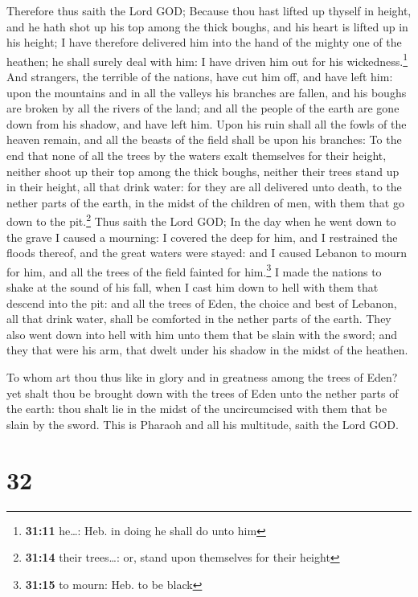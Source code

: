  Therefore thus saith the Lord GOD; Because thou hast
lifted up thyself in height, and he hath shot up his top among the thick
boughs, and his heart is lifted up in his height;  I have
therefore delivered him into the hand of the mighty one of the heathen;
he shall surely deal with him: I have driven him out for his
wickedness.\footnote{\textbf{31:11} he\ldots: Heb. in doing he shall do
  unto him}  And strangers, the terrible of the nations,
have cut him off, and have left him: upon the mountains and in all the
valleys his branches are fallen, and his boughs are broken by all the
rivers of the land; and all the people of the earth are gone down from
his shadow, and have left him.  Upon his ruin shall all
the fowls of the heaven remain, and all the beasts of the field shall be
upon his branches:  To the end that none of all the trees
by the waters exalt themselves for their height, neither shoot up their
top among the thick boughs, neither their trees stand up in their
height, all that drink water: for they are all delivered unto death, to
the nether parts of the earth, in the midst of the children of men, with
them that go down to the pit.\footnote{\textbf{31:14} their trees\ldots:
  or, stand upon themselves for their height}  Thus saith
the Lord GOD; In the day when he went down to the grave I caused a
mourning: I covered the deep for him, and I restrained the floods
thereof, and the great waters were stayed: and I caused Lebanon to mourn
for him, and all the trees of the field fainted for him.\footnote{\textbf{31:15}
  to mourn: Heb. to be black}  I made the nations to
shake at the sound of his fall, when I cast him down to hell with them
that descend into the pit: and all the trees of Eden, the choice and
best of Lebanon, all that drink water, shall be comforted in the nether
parts of the earth.  They also went down into hell with
him unto them that be slain with the sword; and they that were his arm,
that dwelt under his shadow in the midst of the heathen.

 To whom art thou thus like in glory and in greatness
among the trees of Eden? yet shalt thou be brought down with the trees
of Eden unto the nether parts of the earth: thou shalt lie in the midst
of the uncircumcised with them that be slain by the sword. This is
Pharaoh and all his multitude, saith the Lord GOD.

\hypertarget{section-31}{%
\section{32}\label{section-31}}

